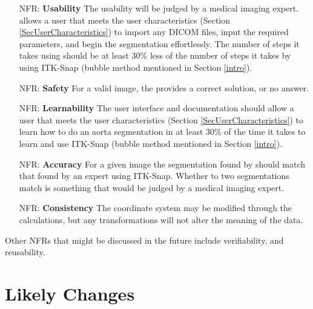 \documentclass[12pt]{article}
\newcounter{nfrnum} %
\begin{document}
\noindent \begin{itemize}

\item[NFR\refstepcounter{nfrnum}\thenfrnum \label{NFR_GUI}:] \textbf{Usability}
The usability will be judged by a medical imaging expert. \progname{} allows a user that meets the user characteristics (Section \ref{SecUserCharacteristics})  to import any DICOM files, input the required parameters, and begin the segmentation effortlessly. The number of steps it takes using \progname{} should be at least 30\% less of the number of steps it takes by using ITK-Snap  (bubble method mentioned in Section \ref{intro}).

\item[NFR\refstepcounter{nfrnum}\thenfrnum \label{NFR_Safety}:] \textbf{Safety}
For a valid image, the \progname{} provides a correct solution, or no answer.

\item[NFR\refstepcounter{nfrnum}\thenfrnum \label{NFR_Learnability}:] \textbf{Learnability}
The user interface and documentation should allow a user that meets the user characteristics (Section \ref{SecUserCharacteristics}) to learn how to do an aorta segmentation in at least 30\% of the time it takes to learn and use ITK-Snap (bubble method mentioned in Section \ref{intro}).

\item[NFR\refstepcounter{nfrnum}\thenfrnum \label{NFR_Accuracy}:] \textbf{Accuracy}
For a given image the segmentation found by \progname{} should match that found by an expert using ITK-Snap. Whether to two segmentations match is something that would be judged by a medical imaging expert.

\item[NFR\refstepcounter{nfrnum}\thenfrnum \label{NFR_Consistency}:] \textbf{Consistency}
The coordinate system may be modified through the calculations, but any transformations will not alter the meaning of the data.


\end{itemize}


\noindent Other NFRs that might be discussed in the future include verifiability, and reusability.

\section{Likely Changes}    
\end{document}
